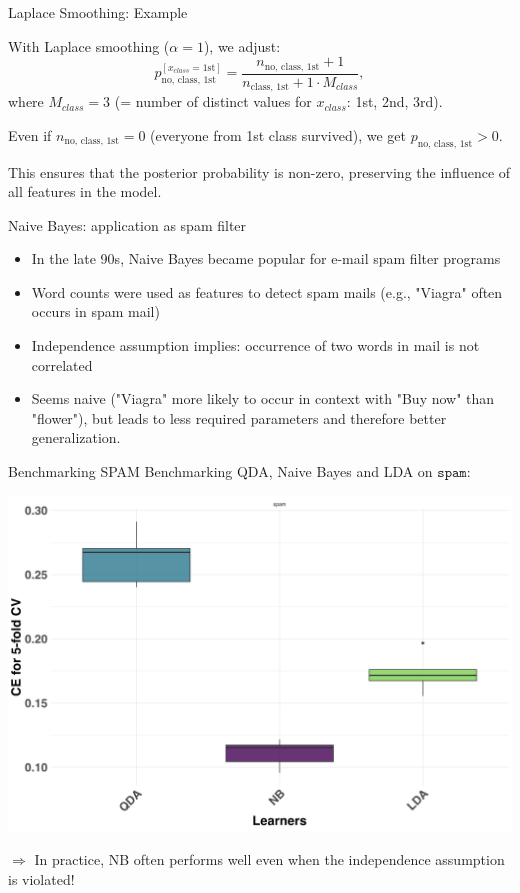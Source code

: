 \documentclass[11pt,compress,t,notes=noshow, xcolor=table]{beamer}
\begin{document}
\begin{vbframe}{Laplace Smoothing: Example}

With Laplace smoothing ($\alpha = 1$), we adjust:
$$
p_{\text{no, class, 1st}}^{[x_{class} = \text{1st}]} = \frac{n_{\text{no, class, 1st}} + 1}{n_{\text{class, 1st}} + 1 \cdot M_{class}},
$$
where $M_{class} = 3$ (= number of distinct values for $x_{class}$: 1st, 2nd, 3rd).

\lz


Even if $n_{\text{no, class, 1st}} = 0$ (everyone from 1st class survived), we get $p_{\text{no, class, 1st}} > 0$.

\lz

This ensures that the posterior probability is non-zero, preserving the influence of all features in the model.


\end{vbframe}



\begin{vbframe}{Naive Bayes: application as spam filter}
\begin{itemize}
  \item In the late 90s, Naive Bayes became popular for e-mail spam filter programs
  \item Word counts were used as features to detect spam mails (e.g., "Viagra" often occurs in spam mail)
  \item Independence assumption implies: occurrence of two words in mail is not correlated
  \item Seems naive ("Viagra" more likely to occur in context with "Buy now" than "flower"), but leads to less required parameters and therefore better generalization.
\end{itemize}
\end{vbframe}

\begin{vbframe}{Benchmarking SPAM}
Benchmarking QDA, Naive Bayes and LDA on $\texttt{spam}$:

\begin{center}
\includegraphics[clip=true, trim={0 0 0 17}, width=0.80\linewidth]{figure/nb-bench.png}
\end{center}

$\Rightarrow$ In practice, NB often performs well even when the independence assumption is violated!
\end{vbframe}

\endlecture
\end{document}
